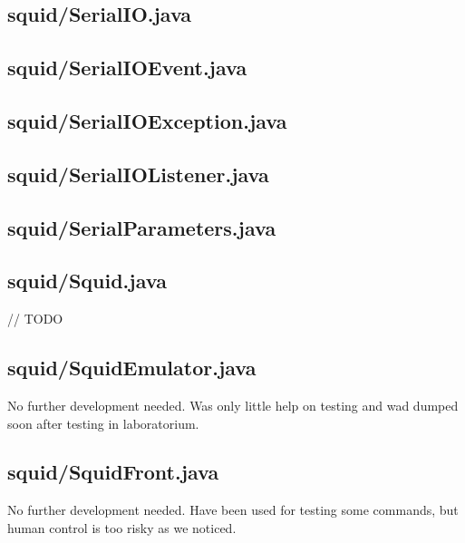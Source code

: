 \subsection{squid/SerialIO.java}

\subsection{squid/SerialIOEvent.java}

\subsection{squid/SerialIOException.java}

\subsection{squid/SerialIOListener.java}

\subsection{squid/SerialParameters.java}

\subsection{squid/Squid.java}
        // TODO

\subsection{squid/SquidEmulator.java}
            No further development needed. Was only little help on testing and wad dumped soon after testing in laboratorium.

\subsection{squid/SquidFront.java}
	No further development needed. Have been used for testing some commands, but human control is too risky as we noticed.
